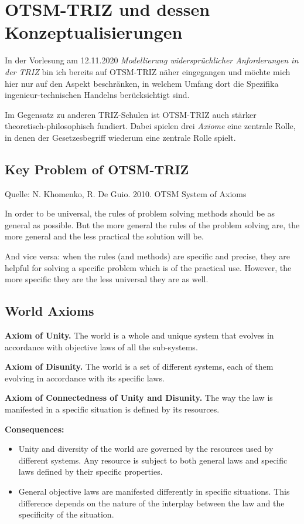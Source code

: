 \documentclass[11pt,a4paper]{article}
\begin{document}
\section{OTSM-TRIZ und dessen Konzeptualisierungen}

In der Vorlesung am 12.11.2020 \emph{Modellierung widersprüchlicher
  Anforderungen in der TRIZ} bin ich bereits auf OTSM-TRIZ näher eingegangen
und möchte mich hier nur auf den Aspekt beschränken, in welchem Umfang  dort
die Spezifika ingenieur-technischen Handelns berücksich\-tigt sind.

Im Gegensatz zu anderen TRIZ-Schulen ist OTSM-TRIZ auch stärker
theoretisch-philoso\-phisch fundiert. Dabei spielen drei \emph{Axiome} eine
zentrale Rolle, in denen der Gesetzesbegriff wiederum eine zentrale Rolle
spielt.

\newpage
\subsection{Key Problem of OTSM-TRIZ}

\begin{center}
  Quelle: N. Khomenko, R. De Guio. 2010. OTSM System of Axioms
\end{center}

In order to be universal, the rules of problem solving methods should be as
general as possible. But the more general the rules of the problem solving
are, the more general and the less practical the solution will be.

And vice versa: when the rules (and methods) are specific and precise, they
are helpful for solving a specific problem which is of the practical use.
However, the more specific they are the less universal they are as well.

\subsection{World Axioms}

\textbf{Axiom of Unity.} The world is a whole and unique system that evolves
in accordance with objective laws of all the sub-systems.

\textbf{Axiom of Disunity.} The world is a set of different systems, each of
them evolving in accordance with its specific laws.

\textbf{Axiom of Connectedness of Unity and Disunity.} The way the law is
manifested in a specific situation is defined by its resources.

\textbf{Consequences:} 
\begin{itemize}[noitemsep]
\item Unity and diversity of the world are governed by the resources used by
  different systems. Any resource is subject to both general laws and specific
  laws defined by their specific properties.
\item General objective laws are manifested differently in specific
  situations. This difference depends on the nature of the interplay between
  the law and the specificity of the situation.
\end{itemize}
\end{document}
